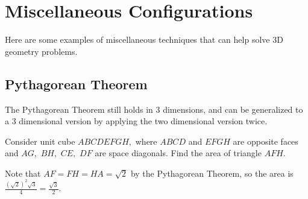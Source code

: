 \section{Miscellaneous Configurations}
Here are some examples of miscellaneous techniques that can help solve 3D geometry problems.

\subsection{Pythagorean Theorem}
The Pythagorean Theorem still holds in 3 dimensions, and can be generalized to a 3 dimensional version by applying the two dimensional version twice.

\begin{exam}
Consider unit cube $ABCDEFGH,$ where $ABCD$ and $EFGH$ are opposite faces and $AG,$ $BH,$ $CE,$ $DF$ are space diagonals. Find the area of triangle $AFH.$
\end{exam}

\begin{sol}
Note that $AF=FH=HA=\sqrt{2}$ by the Pythagorean Theorem, so the area is $\frac{(\sqrt{2})^2\sqrt{3}}{4}=\frac{\sqrt{3}}{2}.$
\end{sol}

